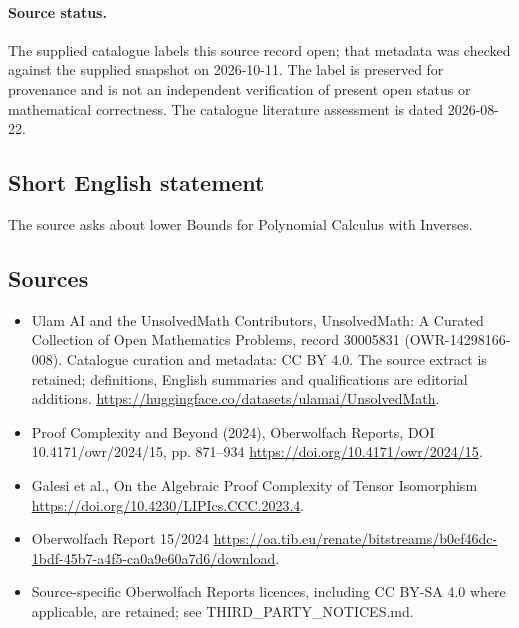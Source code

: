\documentclass[11pt]{article}
\begin{document}
\paragraph{Source status.}
The supplied catalogue labels this source record open; that metadata was checked against the supplied snapshot on 2026-10-11. The label is preserved for provenance and is not an independent verification of present open status or mathematical correctness. The catalogue literature assessment is dated 2026-08-22.
\subsection{Short English statement}
The source asks about lower Bounds for Polynomial Calculus with Inverses.
\subsection{Sources}
\begin{itemize}
\item[\hypertarget{source:30005831:1}{S1}] Ulam AI and the UnsolvedMath Contributors, UnsolvedMath: A Curated Collection of Open Mathematics Problems, record 30005831 (OWR-14298166-008). Catalogue curation and metadata: CC BY 4.0. The source extract is retained; definitions, English summaries and qualifications are editorial additions.
\url{https://huggingface.co/datasets/ulamai/UnsolvedMath}.
\item[\hypertarget{source:30005831:2}{S2}] Proof Complexity and Beyond (2024), Oberwolfach Reports, DOI 10.4171/owr/2024/15, pp. 871--934
\url{https://doi.org/10.4171/owr/2024/15}.
\item[\hypertarget{source:30005831:3}{S3}] Galesi et al., On the Algebraic Proof Complexity of Tensor Isomorphism
\url{https://doi.org/10.4230/LIPIcs.CCC.2023.4}.
\item[\hypertarget{source:30005831:4}{S4}] Oberwolfach Report 15/2024
\url{https://oa.tib.eu/renate/bitstreams/b0ef46dc-1bdf-45b7-a4f5-ca0a9e60a7d6/download}.
\item Source-specific Oberwolfach Reports licences, including CC BY-SA 4.0 where applicable, are retained; see THIRD\_PARTY\_NOTICES.md.
\end{itemize}
\end{document}
